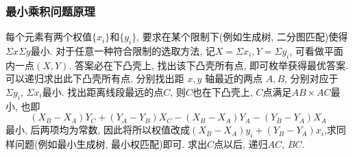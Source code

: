 \subsubsection{最小乘积问题原理}
\noindent
每个元素有两个权值$\{x_i\}$和$\{y_i\}$, 
要求在某个限制下(例如生成树, 二分图匹配)使得${\Sigma x \Sigma y}$最小.
对于任意一种符合限制的选取方法, 记$X=\Sigma x_i, Y=\Sigma y_i$, 可看做平面内一点$(X,Y)$.
答案必在下凸壳上, 找出该下凸壳所有点, 即可枚举获得最优答案.
可以递归求出此下凸壳所有点, 分别找出距 $x, y$ 轴最近的两点 $A, B$,
分别对应于$\Sigma y_i$, $\Sigma x_i$最小.
找出距离线段最远的点$C$, 则$C$也在下凸壳上, $C$点满足$AB\times AC$最小,
也即$$(X_B-X_A)Y_C + (Y_A-Y_B)X_C - (X_B-X_A)Y_A - (Y_B-Y_A)X_A$$最小,
后两项均为常数, 因此将所以权值改成$(X_B-X_A)y_i+(Y_B-Y_A)x_i$,求同样问题(例如最小生成树, 最小权匹配)即可.
求出$C$点以后, 递归$AC$, $BC$.
